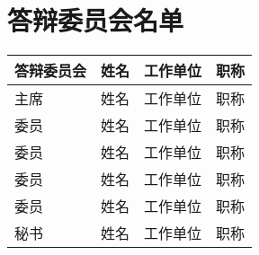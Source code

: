 \chapter*{答辩委员会名单}
\thispagestyle{plain}

\begin{table}[htbp]
	\renewcommand{\arraystretch}{3}
	\centering

	\begin{tabular}{
		|>{\centering\arraybackslash}p{2.6cm}|
		>{\centering\arraybackslash}p{3cm}|
		>{\centering\arraybackslash}p{5cm}|
		>{\centering\arraybackslash}p{2.5cm}|
		}
		\hline
		\textbf{答辩委员会} & \textbf{姓名} & \textbf{工作单位} & \textbf{职称} \\
		\hline
		主席             & 姓名          & 工作单位          & 职称          \\
		\hline
		委员             & 姓名          & 工作单位          & 职称          \\
		\hline
		委员             & 姓名          & 工作单位          & 职称          \\
		\hline
		委员             & 姓名          & 工作单位          & 职称          \\
		\hline
		委员             & 姓名          & 工作单位          & 职称          \\
		\hline
		秘书             & 姓名          & 工作单位          & 职称          \\
		\hline
	\end{tabular}
\end{table}

